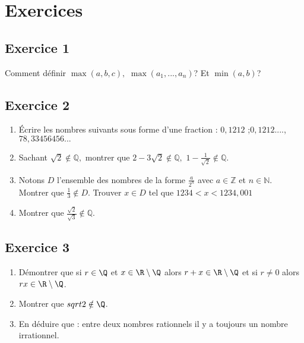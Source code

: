 \documentclass[letterpaper,10pt,french]{jupyterBook}
\begin{document}
\section{Exercices}
\label{\detokenize{exo1:exercices}}\label{\detokenize{exo1::doc}}

\subsection{Exercice 1}
\label{\detokenize{exo1:exercice-1}}
\sphinxAtStartPar
Comment définir \(\max(a,b,c),\) \(\max(a_1,...,a_n)\)? Et \(\min(a,b)\)?


\subsection{Exercice 2}
\label{\detokenize{exo1:exercice-2}}\begin{enumerate}
%
\item {} 
\sphinxAtStartPar
Écrire les nombres suivants sous forme d’une fraction : \(0,1212\) ;\(0,12 12 ....\), \(78,33456456...\)

\item {} 
\sphinxAtStartPar
Sachant \(\sqrt{2}\notin\mathbb{Q},\) montrer que \(2-3\sqrt{2}\notin\mathbb{Q},\) \(1-\frac{1}{\sqrt{2}}\notin\mathbb{Q}.\)

\item {} 
\sphinxAtStartPar
Notons \(D\) l’ensemble des nombres de la forme \(\frac{a}{2^{n}}\) avec \(a\in\mathbb{Z}\) et \(n\in \mathbb{N}\). Montrer que \(\frac{1}{3}\notin D\). Trouver \(x\in D\) tel que \(1234<x<1234,001\)

\item {} 
\sphinxAtStartPar
Montrer que \(\frac{\sqrt{2}}{\sqrt{3}}\notin \mathbb{Q}.\)

\end{enumerate}


\subsection{Exercice 3}
\label{\detokenize{exo1:exercice-3}}\begin{enumerate}
%
\item {} 
\sphinxAtStartPar
Démontrer que si \( r\in \Q\) et \(x \in \R\setminus\Q\) alors \(r +x \in \R\setminus\Q\) et si \(r \neq 0\) alors \(rx \in \R\setminus\Q\).

\item {} 
\sphinxAtStartPar
Montrer que \(sqrt{2}\notin \Q\).

\item {} 
\sphinxAtStartPar
En déduire que : entre deux nombres rationnels il y a toujours un nombre irrationnel.

\end{enumerate}
\end{document}
